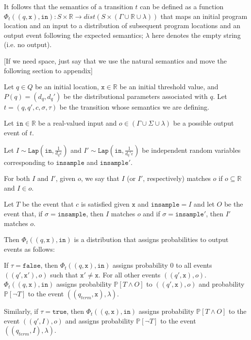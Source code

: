 \documentclass[12pt]{article}
\newcommand{\RR}{\mathbb{R}}
\newcommand{\PP}{\mathbb{P}}
\newcommand{\Lap}{\texttt{Lap}}
\theoremstyle{definition}
\begin{document}
It follows that the semantics of a transition $t$ can be defined as a function $\Phi_t((q, \texttt{x}), \texttt{in}): S\times \RR\to dist(S\times (\Gamma\cup\RR\cup \lambda))$ that maps an initial program location and an input to a distribution of subsequent program locations and an output event following the expected semantics; $\lambda$ here denotes the empty string (i.e. no output). 

{\color{red}[If we need space, just say that we use the natural semantics and move the following section to appendix]}

Let $q\in Q$ be an initial location, $\texttt{x}\in \RR$ be an initial threshold value, and $P(q) = (d_q, d_q')$ be the distributional parameters associated with $q$. Let $t = (q, q', c, \sigma, \tau)$ be the transition whose semantics we are defining. 

Let $\texttt{in}\in \RR$ be a real-valued input and $o\in (\Gamma\cup\Sigma\cup\lambda)$ be a possible output event of $t$.

Let $I\sim \Lap(\texttt{in}, \frac{1}{d_q\varepsilon})$ and $I'\sim \Lap(\texttt{in}, \frac{1}{d_q'\varepsilon})$ be independent random variables corresponding to $\texttt{insample}$ and $\texttt{insample}'$. 

For both $I$ and $I'$, given $o$, we say that $I$ (or $I'$, respectively) matches $o$ if $o\subseteq \RR$ and $I\in o$. 

Let $T$ be the event that $c$ is satisfied given $\texttt{x}$ and $\texttt{insample}=I$ and let $O$ be the event that, if $\sigma=\texttt{insample}$, then $I$ matches $o$ and if $\sigma = \texttt{insample}'$, then $I'$ matches $o$. 

Then $\Phi_t((q, \texttt{x}), \texttt{in})$ is a distribution that assigns probabilities to output events as follows:

If $\tau = \texttt{false}$, then $\Phi_t((q, \texttt{x}), \texttt{in})$ assigns probability 0 to all events $((q', \texttt{x}'), o)$ such that $\texttt{x}'\neq \texttt{x}$. For all other events $((q', \texttt{x}), o)$. $\Phi_t((q, \texttt{x}), \texttt{in})$ assigns probability $\PP[T\land O]$ to $((q', \texttt{x}), o)$ and probability $\PP[\lnot T]$ to the event $((q_{term}, \texttt{x}), \lambda)$.


Similarly, if $\tau = \texttt{true}$, then $\Phi_t((q, \texttt{x}), \texttt{in})$ assigns probability $\PP[T\land O] $ to the event $((q', I), o)$ and assigns probability $\PP[\lnot T]$ to the event $((q_{term}, I), \lambda)$.
\end{document}
